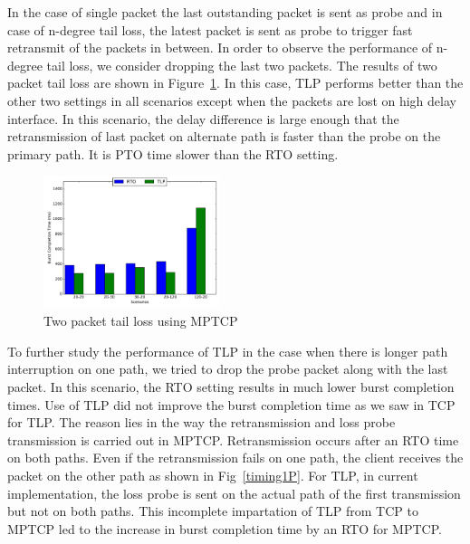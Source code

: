 \documentclass[10pt,conference,compsoc]{IEEEtran}
\begin{document}
In the case of single packet the last outstanding packet is sent as probe and in case of n-degree tail loss,
the latest packet is sent as probe to trigger fast retransmit of the packets in between. In order to observe
the performance of n-degree tail loss, we consider dropping the last two packets. 
The results of two packet tail loss are shown in Figure~\ref{2p}. In this case, TLP performs better than the other 
two settings in all scenarios except when the packets are lost on high delay interface. In this scenario, the delay difference is
large enough that the retransmission of last packet on alternate path is faster than the probe on the primary path. It 
is PTO time slower than the RTO setting.


\begin{figure}[!ht]
\begin{center}
\includegraphics[angle=0, width=0.46\textwidth,natwidth=578.16,natheight=433.62]{plots/2P.pdf}
\caption{Two packet tail loss using MPTCP}\label{2p}
\end{center}
\end{figure}

To further study the performance of TLP in the case when there is longer path interruption on one path, we tried to drop the probe packet along with the last packet. In this scenario, the RTO
setting results in much lower burst completion times. Use of TLP did not improve the burst completion time as we saw in TCP for TLP. The reason
lies in the way the retransmission and loss probe transmission is carried out in MPTCP. Retransmission occurs after an RTO time on both paths.
Even if the retransmission fails on one path, the client receives the packet on the other path as shown in Fig~\ref{timing1P}. For TLP, in
current implementation, the loss probe is sent on the actual path of the first transmission but not on both paths. This incomplete impartation of
TLP from TCP to MPTCP led to the increase in burst completion time by an RTO for MPTCP. 
\end{document}
